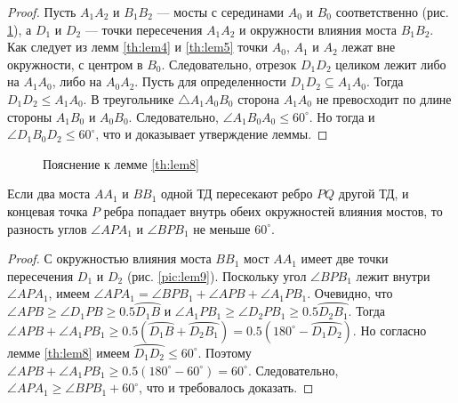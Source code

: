 \documentclass[12pt]{article}
\begin{document}
\begin{proof}
Пусть $A_1A_2$ и $B_1B_2$ --– мосты с серединами $A_0$ и $B_0$ соответственно (рис. \ref{pic:lem8}),
а $D_1$ и $D_2$ --– точки пересечения $A_1A_2$ и окружности влияния моста $B_1B_2$.
Как следует из лемм \ref{th:lem4} и \ref{th:lem5} точки $A_0$, $A_1$ и $A_2$ лежат вне окружности, с центром в $B_0$.
Следовательно, отрезок $D_1D_2$ целиком лежит либо на $A_1A_0$, либо на $A_0A_2$.
Пусть для определенности $D_1D_2 \subseteq A_1A_0$.
Тогда $D_1D_2 \le A_1A_0$.
В треугольнике $\triangle A_1A_0B_0$ сторона $A_1A_0$ не превосходит по длине стороны $A_1B_0$ и $A_0B_0$.
Следовательно, $\angle A_1B_0A_0 \le 60^\circ$.
Но тогда и $\angle D_1B_0D_2 \le 60^\circ$, что и доказывает утверждение леммы.
\end{proof}

\begin{figure}[htb!]
	\caption{Пояснение к лемме \ref{th:lem8}}
	\label{pic:lem8}
\end{figure}

\begin{lemma}
\label{th:lem9}
Если два моста $AA_1$ и $BB_1$ одной ТД пересекают ребро $PQ$ другой ТД, и концевая точка $P$ ребра попадает внутрь обеих окружностей влияния мостов, то разность углов $\angle APA_1$ и $\angle BPB_1$ не меньше $60^\circ$. 
\end{lemma}

\begin{proof}
С окружностью влияния моста $BB_1$ мост $AA_1$ имеет две точки пересечения $D_1$ и $D_2$ (рис. \ref{pic:lem9}).
Поскольку угол $\angle BPB_1$ лежит внутри $\angle APA_1$, имеем $\angle APA_1 = \angle BPB_1 + \angle APB + \angle A_1PB_1$.
Очевидно, что $\angle APB \ge \angle D_1PB \ge 0.5 \wideparen{D_1B}$ и $\angle A_1PB_1 \ge \angle D_2PB_1 \ge 0.5 \wideparen{D_2B_1}$. 
Тогда $\angle APB + \angle A_1PB_1 \ge 0.5(\wideparen{D_1B} + \wideparen{D_2B_1}) = 0.5(180^\circ - \wideparen{D_1D_2})$.
Но согласно лемме \ref{th:lem8} имеем $\wideparen{D_1D_2} \le 60^\circ$.
Поэтому $\angle APB + \angle A_1PB_1 \ge 0.5(180^\circ - 60^\circ) = 60^\circ$.
Следовательно, $\angle APA_1 \ge \angle BPB_1 + 60^\circ$, что и требовалось доказать.
\end{proof}
\end{document}
